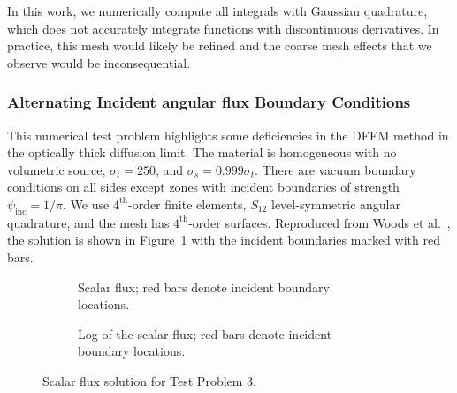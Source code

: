 \documentclass[12pt,letterpaper]{article}
\begin{document}
In this work, we numerically compute all integrals with Gaussian quadrature, which does not accurately integrate functions with discontinuous derivatives. In practice, this mesh would likely be refined and the coarse mesh effects that we observe would be inconsequential.

\subsubsection{Alternating Incident angular flux Boundary Conditions}
\label{sec:XYAltInc}
This numerical test problem highlights some deficiencies in the DFEM method in the optically thick diffusion limit. The material is homogeneous with no volumetric source, $\sigma_t = 250$, and $\sigma_s = 0.999 \sigma_t$. There are vacuum boundary conditions on all sides except zones with incident boundaries of strength $\psi_\text{inc}=1/\pi$. We use $4^\text{th}$-order finite elements, $S_{12}$ level-symmetric angular quadrature, and the mesh has $4^\text{th}$-order surfaces. Reproduced from Woods et al.~\cite{Woods2018HOSnXY}, the solution is shown in Figure~\ref{fig:AlternatingIncident3Pointv2Q4R1mfp250} with the incident boundaries marked with red bars.

\begin{figure}[!htb]
\centering
\begin{subfigure}{\textwidth}
\centering
{}
\caption{Scalar flux; red bars denote incident boundary locations.}
\end{subfigure}
\begin{subfigure}{\textwidth}
\centering
{}
\caption{Log of the scalar flux; red bars denote incident boundary locations.}
\end{subfigure}
\caption{Scalar flux solution for Test Problem 3.}
\label{fig:AlternatingIncident3Pointv2Q4R1mfp250}
\end{figure}
\end{document}

